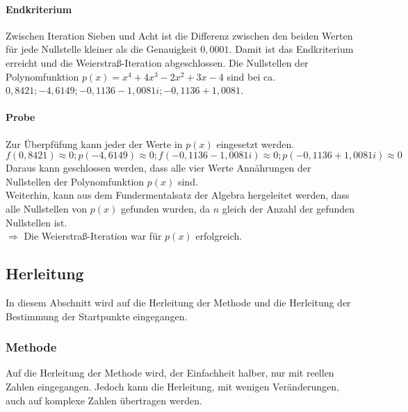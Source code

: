 \documentclass[12pt]{article}
\begin{document}
\paragraph{Endkriterium}
Zwischen Iteration Sieben und Acht ist die Differenz zwischen den beiden Werten für jede Nullstelle kleiner als die Genauigkeit $0,0001$. Damit ist das Endkriterium erreicht und die Weierstraß-Iteration abgeschlossen. 
Die Nullstellen der Polynomfunktion $p(x) = x^4 + 4x^3 - 2x^2 + 3x - 4$ sind bei ca. $0,8421; -4,6149; -0,1136 - 1,0081i; -0,1136 + 1,0081$. 
\paragraph{Probe}
Zur Überpfüfung kann jeder der Werte in $p(x)$ eingesetzt werden.
\begin{displaymath}
    f(0,8421) \approx 0; p(-4,6149) \approx 0; f(-0,1136 - 1,0081i) \approx 0; p(-0,1136 + 1,0081i) \approx 0
\end{displaymath}
Daraus kann geschlossen werden, dass alle vier Werte Annährungen der Nullstellen der Polynomfunktion $p(x)$ sind. \\
Weiterhin, kann aus dem Fundermentalsatz der Algebra hergeleitet werden, dass alle Nullstellen von $p(x)$ gefunden wurden, da $n$ gleich der Anzahl der gefunden Nullstellen ist. \\
$\Rightarrow$ Die Weierstraß-Iteration war für $p(x)$ erfolgreich.

\subsection{Herleitung}
In diesem Abschnitt wird auf die Herleitung der Methode und die Herleitung der Bestimmung der Startpunkte eingegangen.
\subsubsection{Methode}
Auf die Herleitung der Methode wird, der Einfachheit halber, nur mit reellen Zahlen eingegangen. Jedoch kann die Herleitung, mit wenigen Veränderungen, auch auf komplexe Zahlen übertragen werden.
\end{document}
